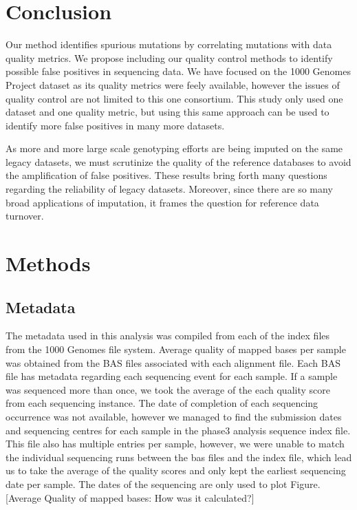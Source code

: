 \documentclass[12pt]{amsart}
\begin{document}
			\section{Conclusion}
Our method identifies spurious mutations by correlating mutations with data quality metrics. 
We propose including our quality control methods to identify possible false positives in sequencing data. 
We have focused on the 1000 Genomes Project dataset as its quality metrics were feely available, however the issues of quality control are not limited to this one consortium. 
This study only used one dataset and one quality metric, but using this same approach can be used to identify more false positives in many more datasets. 

As more and more large scale genotyping efforts are being imputed on the same legacy datasets, we must scrutinize the quality of the reference databases to avoid the amplification of false positives. 
These results bring forth many questions regarding the reliability of legacy datasets. 
Moreover, since there are so many broad applications of imputation, it frames the question for reference data turnover. 



\section{Methods}
\subsection{Metadata}
The metadata used in this analysis was compiled from each of the index files from the 1000 Genomes file system. 
Average quality of mapped bases per sample was obtained from the BAS files associated with each alignment file. 
Each BAS file has metadata regarding each sequencing event for each sample. 
If a sample was sequenced more than once, we took the average of the each quality score from each sequencing instance. 
The date of completion of each sequencing occurrence was not available, however we managed to find the submission dates and sequencing centres for each sample in the phase3 analysis sequence index file.  
This file also has multiple entries per sample, however, we were unable to match the individual sequencing runs between the bas files and the index file, which lead us to take the average of the quality scores and only kept the earliest sequencing date per sample. 
The dates of the sequencing are only used to plot Figure. [Average Quality of mapped bases: How was it calculated?]
\end{document}

